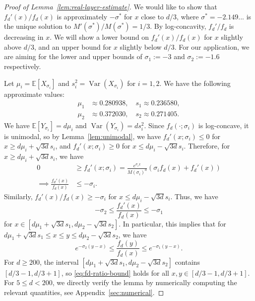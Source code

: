 \documentclass[10pt,a4paper]{amsart}
\newcommand{\EE}{\mathbb{E}}
\DeclareMathOperator{\Var}{Var}
\begin{document}
\begin{proof}[Proof of Lemma~\ref{lem:real-layer-estimate}]
    We would like to show that $f_d'(x)/f_d(x)$ is approximately $-\sigma^*$ for $x$ close to $d/3$, where $\sigma^*=-2.149...$ is the unique solution to $M'(\sigma^*)/M(\sigma^*)=1/3$. By log-concavity, $f_d'/f_d$ is decreasing in $x$. We will show a lower bound on $f_d'(x)/f_d(x)$ for $x$ slightly above $d/3$, and an upper bound for $x$ slightly below $d/3$. For our application, we are aiming for the lower and upper bounds of $\sigma_1:=-3$ and $\sigma_2:=-1.6$ respectively.

    Let $\mu_i=\EE[X_{\sigma_i}]$ and $s_i^2=\Var(X_{\sigma_i})$ for $i=1,2$. We have the following approximate values:
    \begin{align*}
        \mu_1 &\approx 0.280938, \quad s_1 \approx 0.236580, \\
        \mu_2 &\approx 0.372030, \quad s_2 \approx 0.271405.
    \end{align*}
    We have $\EE[Y_{\sigma_i}] = d\mu_i$ and $\Var(Y_{\sigma_i}) = d s_i^2$. Since $f_d(\cdot;\sigma_i)$ is log-concave, it is unimodal, so by Lemma~\ref{lem:unimodal}, we have $f_d'(x;\sigma_i)\leq 0$ for $x\geq d\mu_i + \sqrt{3d} s_i$, and $f_d'(x;\sigma_i)\geq 0$ for $x\leq d\mu_i - \sqrt{3d} s_i$. Therefore, for $x\geq d\mu_i + \sqrt{3d} s_i$, we have
    \begin{align*}
        0 &\geq f_d'(x;\sigma_i) = \frac{e^{\sigma_i x}}{M(\sigma_i)^d}(\sigma_i f_d(x) + f_d'(x)) \\
        \implies \frac{f_d'(x)}{f_d(x)} &\leq -\sigma_i.
    \end{align*}
    Similarly, $f_d'(x)/f_d(x)\geq -\sigma_i$ for $x\leq d\mu_i - \sqrt{3d} s_i$. Thus, we have
    \[-\sigma_2 \leq \frac{f_d'(x)}{f_d(x)} \leq -\sigma_1\]
    for $x\in [d\mu_1 + \sqrt{3d} s_1, d\mu_2 - \sqrt{3d} s_2]$. In particular, this implies that for $d\mu_1 + \sqrt{3d} s_1 \leq x\leq y\leq d\mu_2 - \sqrt{3d} s_2$, we have
    \begin{equation} \label{eq:fd-ratio-bound}
        e^{-\sigma_2(y-x)} \leq \frac{f_d(y)}{f_d(x)} \leq e^{-\sigma_1(y-x)}.
    \end{equation}
    For $d\geq 200$, the interval $[d\mu_1 + \sqrt{3d} s_1, d\mu_2 - \sqrt{3d} s_2]$ contains $[d/3-1, d/3+1]$, so \eqref{eq:fd-ratio-bound} holds for all $x,y\in [d/3-1, d/3+1]$. For $5\leq d < 200$, we directly verify the lemma by numerically computing the relevant quantities, see Appendix~\ref{sec:numerical}.


\end{proof}
\end{document}
